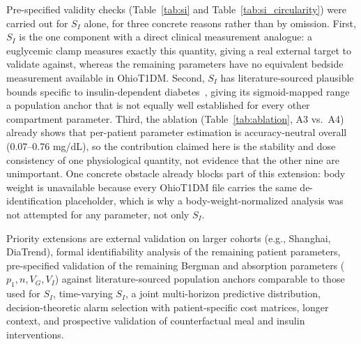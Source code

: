 \documentclass[journal]{IEEEtran}
\begin{document}
Pre-specified validity checks (Table~\ref{tab:si} and Table~\ref{tab:si_circularity}) were carried out for $S_I$ alone, for three concrete reasons rather than by omission. First, $S_I$ is the one component with a direct clinical measurement analogue: a euglycemic clamp measures exactly this quantity, giving a real external target to validate against, whereas the remaining parameters have no equivalent bedside measurement available in OhioT1DM\@. Second, $S_I$ has literature-sourced plausible bounds specific to insulin-dependent diabetes~\cite{ref33}, giving its sigmoid-mapped range a population anchor that is not equally well established for every other compartment parameter. Third, the ablation (Table~\ref{tab:ablation}, A3 vs.\ A4) already shows that per-patient parameter estimation is accuracy-neutral overall (0.07--0.76 mg/dL), so the contribution claimed here is the stability and dose consistency of one physiological quantity, not evidence that the other nine are unimportant. One concrete obstacle already blocks part of this extension: body weight is unavailable because every OhioT1DM file carries the same de-identification placeholder, which is why a body-weight-normalized analysis was not attempted for any parameter, not only $S_I$.

Priority extensions are external validation on larger cohorts (e.g., Shanghai, DiaTrend), formal identifiability analysis of the remaining patient parameters, pre-specified validation of the remaining Bergman and absorption parameters ($p_1, n, V_G, V_I$) against literature-sourced population anchors comparable to those used for $S_I$, time-varying $S_I$, a joint multi-horizon predictive distribution, decision-theoretic alarm selection with patient-specific cost matrices, longer context, and prospective validation of counterfactual meal and insulin interventions.

\end{document}
